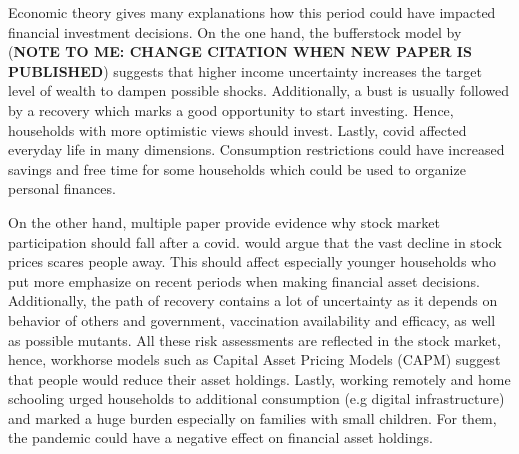 \documentclass[ProjectABM]{subfiles}
\begin{document}


Economic theory gives many explanations how this period could have impacted financial investment decisions. On the one hand, the bufferstock model by \cite{carroll2009bufferstock} (\textbf{NOTE TO ME: CHANGE CITATION WHEN NEW PAPER IS PUBLISHED}) suggests that higher income uncertainty increases the target level of wealth to dampen possible shocks. %
Additionally, a bust is usually followed by a recovery which marks a good opportunity to start investing. Hence, households with more optimistic views should invest. Lastly, covid affected everyday life in many dimensions. Consumption restrictions could have increased savings and free time for some households which could be used to organize personal finances. 

On the other hand, multiple paper provide evidence why stock market participation should fall after a covid. \cite{malmendier_2011} would argue that the vast decline in stock prices scares people away. This should affect especially younger households who put more emphasize on recent periods when making financial asset decisions. Additionally, the path of recovery contains a lot of uncertainty as it depends on behavior of others and government, vaccination availability and efficacy, as well as possible mutants. All these risk assessments are reflected in the stock market, hence, workhorse models such as Capital Asset Pricing Models (CAPM) suggest that people would reduce their asset holdings. Lastly, working remotely and home schooling urged households to additional consumption (e.g digital infrastructure) and marked a huge burden especially on families with small children. For them, the pandemic could have a negative effect on financial asset holdings.
\end{document}
